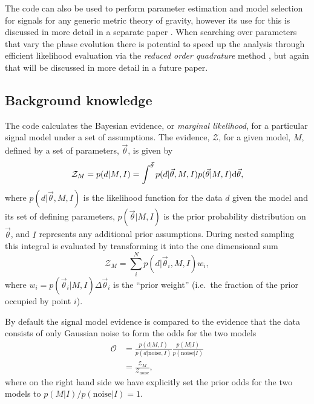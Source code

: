 The code can also be used to perform parameter estimation and model selection for signals for any generic
metric theory of gravity, however its use for this is discussed in more detail in a separate paper \citep{MaxCWpolariations}. When
searching over parameters that vary the phase evolution there is potential to speed up the analysis through
efficient likelihood evaluation via the {\it reduced order quadrature} method \citep[see, e.g.,][]{2014PhRvX...4c1006F,2015PhRvL.114g1104C},
but again that will be discussed in more detail in a future paper.

\subsection{Background knowledge}\label{sec:general}

The code calculates the Bayesian evidence, or {\it marginal likelihood}, for a particular signal model under
a set of assumptions. The evidence, $\mathcal{Z}$, for a given model, $M$, defined by a set of parameters, $\vec{\theta}$, is given by
\begin{equation}\label{eq:evidence}
\mathcal{Z}_M = p(d|M,I) = \int^{\vec{\theta}} p(d|\vec{\theta},M,I)p(\vec{\theta}|M,I) {\rm d}\vec{\theta},
\end{equation}
where $p(d|\vec{\theta},M,I)$ is the likelihood function for the data $d$ given the
model and its set of defining parameters, $p(\vec{\theta}|M,I)$ is the prior probability distribution on
$\vec{\theta}$, and $I$ represents any additional prior assumptions. During nested sampling this integral is evaluated by transforming it into the one dimensional
sum
\begin{equation}\label{eq:nestedsampev}
\mathcal{Z}_M = \sum_i^N p(d|\vec{\theta}_i,M,I) w_i,
\end{equation}
where $w_i = p(\vec{\theta}_i|M,I) \Delta\vec{\theta}_i$ is the ``prior weight''
(i.e.\ the fraction of the prior occupied by point $i$).

By default the signal model evidence is compared to the evidence that the data consists of only Gaussian noise to form the odds for the two models
\begin{align}\label{eq:oddsratio}
\mathcal{O} &= \frac{p(d|M,I)}{p(d|\text{noise},I)}\frac{p(M|I)}{p(\text{noise}|I)} \nonumber \\
&= \frac{\mathcal{Z}_M}{\mathcal{Z}_{\text{noise}}},
\end{align}
where on the right hand side we have explicitly set the prior odds for the two models to
$p(M|I)/p(\text{noise}|I) = 1$.

